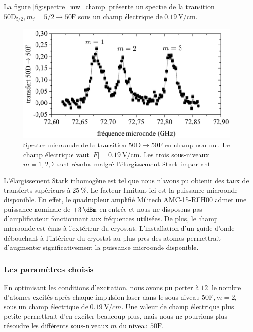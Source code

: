 La figure \eqref{fig:spectre_mw_champ} présente un spectre de la transition $\mathrm{50D}_{5/2},m_j=5/2 \rightarrow \mathrm{50F}$ sous un champ électrique de $\SI{0.19}{\V/\cm}$.
%
\begin{figure}[!h]
\centering
\includegraphics[width=0.85\linewidth]{figures/circulars/spectre_mw_champ}
\caption[Spectre microonde de la transition $\mathrm{50D\rightarrow 50F}$ en champ non nul]{
Spectre microonde de la transition $\mathrm{50D\rightarrow 50F}$ en champ non nul.
Le champ électrique vaut $|F| = \SI{0.19}{\V/\cm}$.
Les trois sous-niveaux $m=1,2,3$ sont résolus malgré l'élargissement Stark important.}
\label{fig:spectre_mw_champ}
\end{figure}
%
L'élargissement Stark inhomogène est tel que nous n'avons pu obtenir des taux de transferts supérieurs à $\SI{25}{\percent}$.
Le facteur limitant ici est la puissance microonde disponible.
En effet, le quadrupleur amplifié Militech AMC-15-RFH00 admet une puissance nominale de $\SI[retain-explicit-plus]{+3}{\dBm}$ en entrée et nous ne disposons pas d'amplificateur fonctionnant aux fréquences utilisées.
De plus, le champ microonde est émis à l'extérieur du cryostat.
L'installation d'un guide d'onde débouchant à l'intérieur du cryostat au plus près des atomes permettrait d'augmenter significativement la puissance microonde disponible.

\subsubsection*{Les paramètres choisis}
\noindent En optimisant les conditions d'excitation, nous avons pu porter à $\SI{12}{}$ le nombre d'atomes excités après chaque impulsion laser dans le sous-niveau $\mathrm{50F},m=2$, sous un champ électrique de $\SI{0.19}{\V/cm}$.
Une valeur de champ électrique plus petite permettrait d'en exciter beaucoup plus, mais nous ne pourrions plus résoudre les différents sous-niveaux $m$ du niveau $\mathrm{50F}$.

